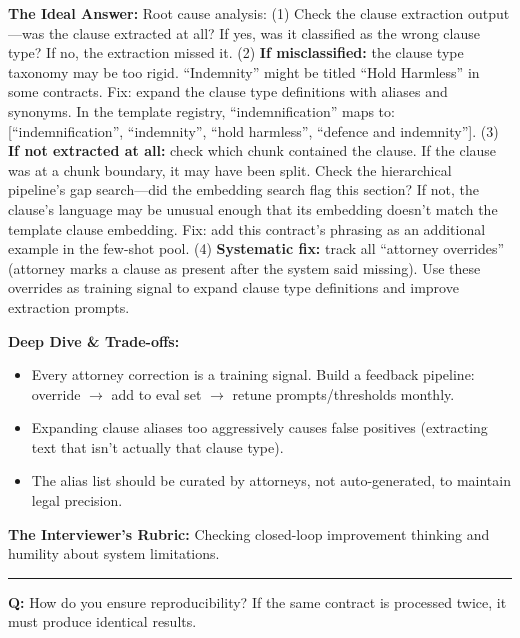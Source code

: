 \textbf{The Ideal Answer:} Root cause analysis: (1) Check the clause extraction output---was the clause extracted at all? If yes, was it classified as the wrong clause type? If no, the extraction missed it. (2) \textbf{If misclassified:} the clause type taxonomy may be too rigid. ``Indemnity'' might be titled ``Hold Harmless'' in some contracts. Fix: expand the clause type definitions with aliases and synonyms. In the template registry, ``indemnification'' maps to: [``indemnification'', ``indemnity'', ``hold harmless'', ``defence and indemnity'']. (3) \textbf{If not extracted at all:} check which chunk contained the clause. If the clause was at a chunk boundary, it may have been split. Check the hierarchical pipeline's gap search---did the embedding search flag this section? If not, the clause's language may be unusual enough that its embedding doesn't match the template clause embedding. Fix: add this contract's phrasing as an additional example in the few-shot pool. (4) \textbf{Systematic fix:} track all ``attorney overrides'' (attorney marks a clause as present after the system said missing). Use these overrides as training signal to expand clause type definitions and improve extraction prompts.

\textbf{Deep Dive \& Trade-offs:}
\begin{itemize}
  \item Every attorney correction is a training signal. Build a feedback pipeline: override $\rightarrow$ add to eval set $\rightarrow$ retune prompts/thresholds monthly.
  \item Expanding clause aliases too aggressively causes false positives (extracting text that isn't actually that clause type).
  \item The alias list should be curated by attorneys, not auto-generated, to maintain legal precision.
\end{itemize}

\textbf{The Interviewer's Rubric:} Checking closed-loop improvement thinking and humility about system limitations.

\bigskip\hrule\bigskip

\textbf{Q:} How do you ensure reproducibility? If the same contract is processed twice, it must produce identical results.

